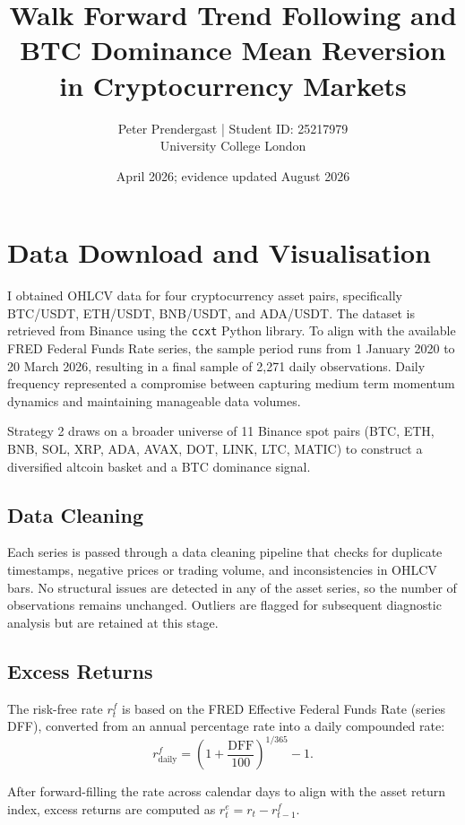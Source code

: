 \documentclass[10pt,a4paper]{article}
\title{Walk Forward Trend Following and BTC Dominance Mean Reversion
in Cryptocurrency Markets}
\author{Peter Prendergast | Student ID: 25217979\\ University College London}
\date{April 2026; evidence updated August 2026}
\newcommand{\dailyreturn}{r_t}
\newcommand{\riskfree}{r_t^{f}}
\newcommand{\excessreturn}{r_t^{e}}
\begin{document}
\maketitle
{}

\section{Data Download and Visualisation}

I obtained OHLCV data for four cryptocurrency asset pairs, specifically BTC/USDT, ETH/USDT, BNB/USDT, and ADA/USDT. The dataset is retrieved from Binance using the \texttt{ccxt} Python library. To align with the available FRED Federal Funds Rate series, the sample period runs from 1 January 2020 to 20 March 2026, resulting in a final sample of 2,271 daily observations. Daily frequency represented a compromise between capturing medium term momentum dynamics and maintaining manageable data volumes.

Strategy 2 draws on a broader universe of 11 Binance spot pairs (BTC, ETH, BNB, SOL, XRP, ADA, AVAX, DOT, LINK, LTC, MATIC) to construct a diversified altcoin basket and a BTC dominance signal.

\subsection{Data Cleaning}

Each series is passed through a data cleaning pipeline that checks for duplicate timestamps, negative prices or trading volume, and inconsistencies in OHLCV bars. No structural issues are detected in any of the asset series, so the number of observations remains unchanged. Outliers are flagged for subsequent diagnostic analysis but are retained at this stage.

\subsection{Excess Returns}

The risk-free rate $\riskfree$ is based on the FRED Effective Federal Funds Rate (series DFF), converted from an annual percentage rate into a daily compounded rate:
\begin{equation}
    r_{\text{daily}}^{f} = \left(1 + \frac{\text{DFF}}{100}\right)^{1/365} - 1.
\end{equation}

After forward-filling the rate across calendar days to align with the asset return index, excess returns are computed as $\excessreturn = \dailyreturn - r_{t-1}^{f}$.
\end{document}
